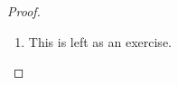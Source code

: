 \begin{proof}
\begin{enumerate}
  \item This is left as an exercise.
  \end{enumerate}
\end{proof}

